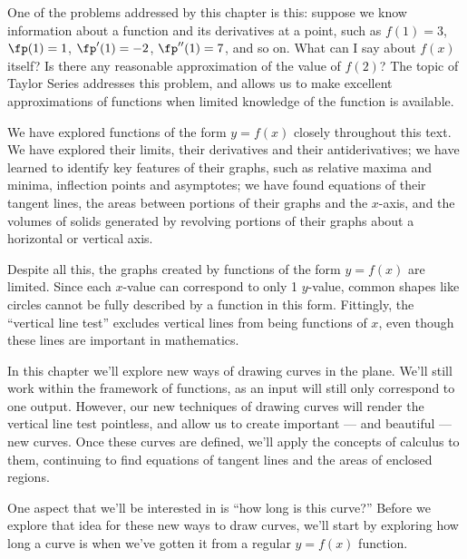 One of the problems addressed by this chapter is this: suppose we know information about a function and its derivatives at a point, such as  $f(1) = 3$, $\fp(1) = 1$, $\fp'(1) = -2$, $\fp''(1) = 7$, and so on. What can I say about $f(x)$ itself? Is there any reasonable approximation of the value of $f(2)$? The topic of Taylor Series addresses this problem, and allows us to make excellent approximations of functions when limited knowledge of the function is available.









%





We have explored functions of the form $y=f(x)$ closely throughout this text. We have explored their limits, their derivatives and their antiderivatives; we have learned to identify key features of their graphs, such as relative maxima and minima, inflection points and asymptotes; we have found equations of their tangent lines, the areas between portions of their graphs and the $x$-axis, and the volumes of solids generated by revolving portions of their graphs about a horizontal or vertical axis.

Despite all this, the graphs created by functions of the form $y=f(x)$ are limited. Since each $x$-value can correspond to only 1 $y$-value, common shapes like circles cannot be fully described by a function in this form.  Fittingly, the ``vertical line test''  excludes vertical lines from being functions of $x$, even though these lines are important in mathematics.

In this chapter we'll explore new ways of drawing curves in the plane. We'll still work within the framework of functions, as an input will still only correspond to one output. However, our new techniques of drawing curves will render the vertical line test pointless, and allow us to create important --- and beautiful --- new curves. Once these curves are defined, we'll apply the concepts of calculus to them, continuing to find equations of tangent lines and the areas of enclosed regions.

One aspect that we'll be interested in is ``how long is this curve?'' Before we explore that idea for these new ways to draw curves, we'll start by exploring how long a curve is when we've gotten it from a regular $y=f(x)$ function.







\cleardoublepage

